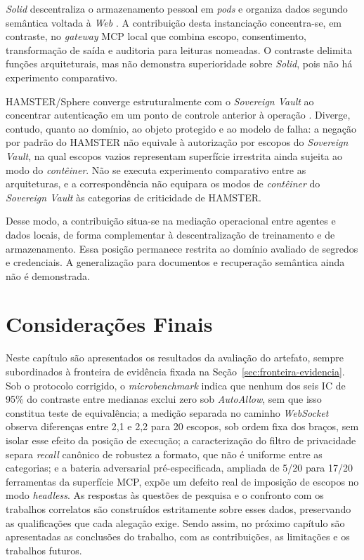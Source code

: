 \textit{Solid} descentraliza o armazenamento pessoal em \textit{pods} e organiza dados segundo semântica voltada à \textit{Web} \cite{sambra2016}. A contribuição desta instanciação concentra-se, em contraste, no \textit{gateway} MCP local que combina escopo, consentimento, transformação de saída e auditoria para leituras nomeadas. O contraste delimita funções arquiteturais, mas não demonstra superioridade sobre \textit{Solid}, pois não há experimento comparativo.

HAMSTER/Sphere converge estruturalmente com o \textit{Sovereign Vault} ao concentrar autenticação em um ponto de controle anterior à operação \cite{pigatto2016}. Diverge, contudo, quanto ao domínio, ao objeto protegido e ao modelo de falha: a negação por padrão do HAMSTER não equivale à autorização por escopos do \textit{Sovereign Vault}, na qual escopos vazios representam superfície irrestrita ainda sujeita ao modo do \textit{contêiner}. Não se executa experimento comparativo entre as arquiteturas, e a correspondência não equipara os modos de \textit{contêiner} do \textit{Sovereign Vault} às categorias de criticidade de HAMSTER.

Desse modo, a contribuição situa-se na mediação operacional entre agentes e dados locais, de forma complementar à descentralização de treinamento e de armazenamento. Essa posição permanece restrita ao domínio avaliado de segredos e credenciais. A generalização para documentos e recuperação semântica ainda não é demonstrada.

\section{Considerações Finais}

Neste capítulo são apresentados os resultados da avaliação do artefato, sempre subordinados à fronteira de evidência fixada na Seção~\ref{sec:fronteira-evidencia}. Sob o protocolo corrigido, o \textit{microbenchmark} indica que nenhum dos seis IC de 95\% do contraste entre medianas exclui zero sob \textit{AutoAllow}, sem que isso constitua teste de equivalência; a medição separada no caminho \textit{WebSocket} observa diferenças entre 2,1 e 2,2\micro{} para 20 escopos, sob ordem fixa dos braços, sem isolar esse efeito da posição de execução; a caracterização do filtro de privacidade separa \textit{recall} canônico de robustez a formato, que não é uniforme entre as categorias; e a bateria adversarial pré-especificada, ampliada de 5/20 para 17/20 ferramentas da superfície MCP, expõe um defeito real de imposição de escopos no modo \textit{headless}. As respostas às questões de pesquisa e o confronto com os trabalhos correlatos são construídos estritamente sobre esses dados, preservando as qualificações que cada alegação exige. Sendo assim, no próximo capítulo são apresentadas as conclusões do trabalho, com as contribuições, as limitações e os trabalhos futuros.


